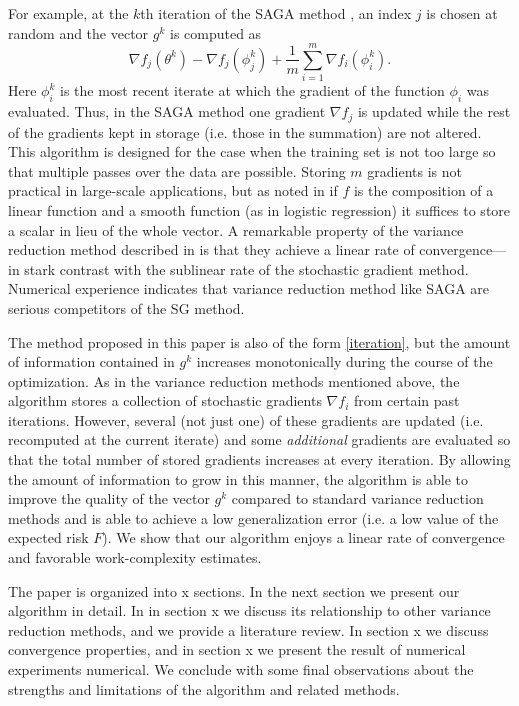 \documentclass[11pt]{article}
\begin{document}
For example, at the $k$th iteration of the SAGA method \cite{NIPS2014_5258}, an index $j$ is chosen at random and the vector $g^k$ is computed as
\begin{equation}   \label{saga} 
     \nabla f_j(\theta^k) -  \nabla f_j(\phi^k_j) + \frac{1}{m}\sum_{i=1}^{m}  \nabla f_i (\phi_i^k).
     \end{equation}
Here $\phi_i^k$ is the most recent iterate at which the gradient of the function $\phi_i$ was evaluated. Thus, in the SAGA method one  gradient  $\nabla f_j$ is updated while the rest of the gradients kept in storage (i.e. those in the summation) are not altered. This algorithm is designed for the case when the training set is not too large so that multiple passes over the data are possible. Storing $m$ gradients is not practical in large-scale applications, but as noted in \cite{roux2012stochastic} if $f$ is the composition of a linear function and a smooth function (as in logistic regression) it suffices to store a scalar in lieu of the whole vector. A remarkable property of the variance reduction method described in \cite{NIPS2014_5258} is that they achieve a linear rate of convergence---in stark contrast with the sublinear rate of the stochastic gradient method. Numerical experience indicates that variance reduction method like SAGA are serious competitors of the SG method.

The method proposed in this paper is also of the form \eqref{iteration}, but the amount of information contained in $g^k$ increases monotonically during the course of the optimization. As in the variance reduction methods mentioned above,  the algorithm stores a collection of stochastic gradients $\nabla f_i$ from certain past iterations. However, several (not just one) of these gradients are updated (i.e. recomputed at the current iterate) and some \emph{additional} gradients are evaluated so that the total number of stored gradients increases at every iteration.  By allowing the amount of information to grow in this manner, the algorithm is able to improve the quality of the vector $g^k$ compared to standard variance reduction methods and is able to achieve a low generalization error (i.e. a low value of the expected risk $F$). We show that our algorithm  enjoys a linear rate of convergence and favorable work-complexity estimates.

The paper is organized into x sections. In the next section we present our algorithm in detail. In in section x we discuss its relationship to other variance reduction methods, and we provide a literature review. In section x we discuss  convergence properties, and in section x we present the result of numerical experiments numerical. We conclude with some final observations about the strengths and limitations of the algorithm  and related methods.
\end{document}
